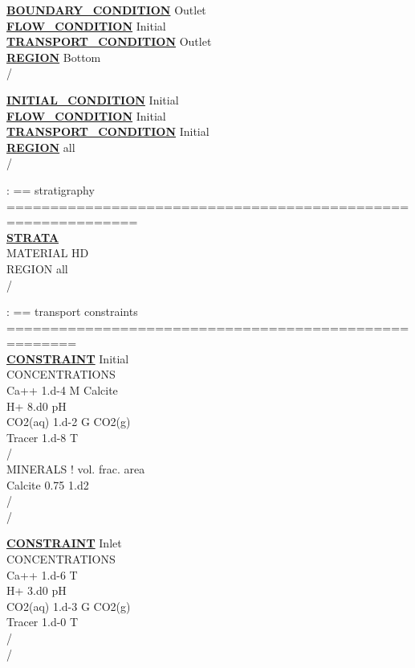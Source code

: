 \documentclass[12pt]{article}
\begin{document}
\noindent
\hyperlink{target_bcon}{\bf BOUNDARY\_CONDITION} Outlet\\
\hyperlink{target_flow_cond}{\bf FLOW\_CONDITION} Initial\\
\hyperlink{target_trans_cond}{\bf TRANSPORT\_CONDITION} Outlet\\
\hyperlink{target_region}{\bf REGION} Bottom\\
/

\noindent
\hyperlink{target_init}{\bf INITIAL\_CONDITION} Initial\\
\hyperlink{target_flow_cond}{\bf FLOW\_CONDITION} Initial\\
\hyperlink{target_trans_cond}{\bf TRANSPORT\_CONDITION} Initial\\
\hyperlink{target_region}{\bf REGION} all\\
/

\noindent
: == stratigraphy =============================================================\\
\hyperlink{target_strata}{\bf STRATA}\\
MATERIAL HD\\
REGION all\\
/

\noindent
: == transport constraints ======================================================\\
\hyperlink{target_constraint}{\bf CONSTRAINT} Initial\\
CONCENTRATIONS\\
Ca++    1.d-4   M  Calcite\\
H+      8.d0   pH\\
CO2(aq) 1.d-2   G  CO2(g)\\
Tracer  1.d-8   T\\
/\\
MINERALS ! vol. frac.  area\\
Calcite      0.75      1.d2\\
/\\
/

\noindent
\hyperlink{target_constraint}{\bf CONSTRAINT} Inlet\\
CONCENTRATIONS\\
Ca++    1.d-6   T\\
H+      3.d0   pH\\
CO2(aq) 1.d-3   G  CO2(g)\\
Tracer  1.d-0   T\\
/\\
/
\normalsize

\newpage
\protect\hypertarget{target_bcon}{}
\end{document}
